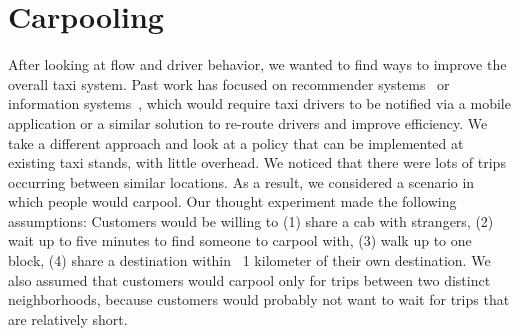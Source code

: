 \documentclass[twocolumn]{article}
\begin{document}
\section{Carpooling}
After looking at flow and driver behavior, we wanted to find ways to improve the overall taxi system. Past work has focused on recommender systems~\cite{ZHAN:2014} or information systems~\cite{KIM:2005}, which would require taxi drivers to be notified via a mobile application or a similar solution to re-route drivers and improve efficiency. We take a different approach and look at a policy that can be implemented at existing taxi stands, with little overhead. We noticed that there were lots of trips occurring between similar locations. As a result, we considered a scenario in which people would carpool. Our thought experiment made the following assumptions: Customers would be willing to (1) share a cab with strangers, (2) wait up to five minutes to find someone to carpool with, (3) walk up to one block, (4) share a destination within ~1 kilometer of their own destination. We also assumed that customers would carpool only for trips between two distinct neighborhoods, because customers would probably not want to wait for trips that are relatively short.
\end{document}
